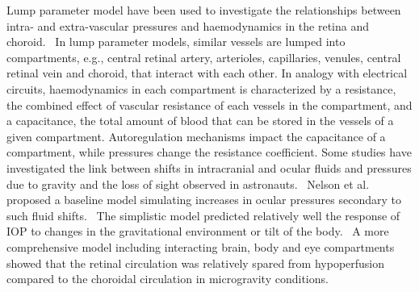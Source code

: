\documentclass[12pt,a4paper]{journal}
\begin{document}
Lump parameter model have been used to investigate the relationships between intra- and extra-vascular pressures and haemodynamics in the retina and choroid.~\cite{Chiaravalli_2021,Fawzi_2019,Guidoboni_2014a,Nelson_2017,Petersen_2022,Prudhomme_2021,Sala_2020,Salerni_2019}
In lump parameter models, similar vessels are lumped into compartments, e.g., central retinal artery, arterioles, capillaries, venules, central retinal vein and choroid, that interact with each other.
In analogy with electrical circuits, haemodynamics in each compartment is characterized by a resistance, the combined effect of vascular resistance of each vessels in the compartment, and a capacitance, the total amount of blood that can be stored in the vessels of a given compartment.
Autoregulation mechanisms impact the capacitance of a compartment, while pressures change the resistance coefficient.
Some studies have investigated the link between shifts in intracranial and ocular fluids and pressures due to gravity and the loss of sight observed in astronauts.~\cite{Nelson_2017,Petersen_2022,Salerni_2019}
Nelson et al. proposed a baseline model simulating increases in ocular pressures secondary to such fluid shifts.~\cite{Nelson_2017}
The simplistic model predicted relatively well the response of IOP to changes in the gravitational environment or tilt of the body.~\cite{Nelson_2017,Petersen_2022}
A more comprehensive model including interacting brain, body and eye compartments showed that the retinal circulation was relatively spared from hypoperfusion compared to the choroidal circulation in microgravity conditions.~\cite{Salerni_2019}
\end{document}
